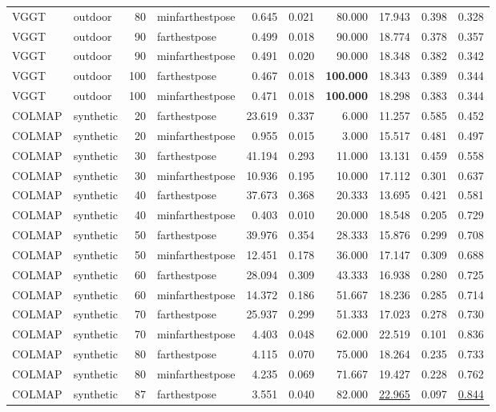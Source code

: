 \begin{table}[H]
\begin{tabular}{llrlrrrrrr}
VGGT & outdoor & 80 & minfarthestpose & 0.645 & 0.021 & 80.000 & 17.943 & 0.398 & 0.328 \\
VGGT & outdoor & 90 & farthestpose & 0.499 & 0.018 & 90.000 & 18.774 & 0.378 & 0.357 \\
VGGT & outdoor & 90 & minfarthestpose & 0.491 & 0.020 & 90.000 & 18.348 & 0.382 & 0.342 \\
VGGT & outdoor & 100 & farthestpose & 0.467 & 0.018 & \textbf{100.000} & 18.343 & 0.389 & 0.344 \\
VGGT & outdoor & 100 & minfarthestpose & 0.471 & 0.018 & \textbf{100.000} & 18.298 & 0.383 & 0.344 \\
\midrule
COLMAP & synthetic & 20 & farthestpose & 23.619 & 0.337 & 6.000 & 11.257 & 0.585 & 0.452 \\
COLMAP & synthetic & 20 & minfarthestpose & 0.955 & 0.015 & 3.000 & 15.517 & 0.481 & 0.497 \\
COLMAP & synthetic & 30 & farthestpose & 41.194 & 0.293 & 11.000 & 13.131 & 0.459 & 0.558 \\
COLMAP & synthetic & 30 & minfarthestpose & 10.936 & 0.195 & 10.000 & 17.112 & 0.301 & 0.637 \\
COLMAP & synthetic & 40 & farthestpose & 37.673 & 0.368 & 20.333 & 13.695 & 0.421 & 0.581 \\
COLMAP & synthetic & 40 & minfarthestpose & 0.403 & 0.010 & 20.000 & 18.548 & 0.205 & 0.729 \\
COLMAP & synthetic & 50 & farthestpose & 39.976 & 0.354 & 28.333 & 15.876 & 0.299 & 0.708 \\
COLMAP & synthetic & 50 & minfarthestpose & 12.451 & 0.178 & 36.000 & 17.147 & 0.309 & 0.688 \\
COLMAP & synthetic & 60 & farthestpose & 28.094 & 0.309 & 43.333 & 16.938 & 0.280 & 0.725 \\
COLMAP & synthetic & 60 & minfarthestpose & 14.372 & 0.186 & 51.667 & 18.236 & 0.285 & 0.714 \\
COLMAP & synthetic & 70 & farthestpose & 25.937 & 0.299 & 51.333 & 17.023 & 0.278 & 0.730 \\
COLMAP & synthetic & 70 & minfarthestpose & 4.403 & 0.048 & 62.000 & 22.519 & 0.101 & 0.836 \\
COLMAP & synthetic & 80 & farthestpose & 4.115 & 0.070 & 75.000 & 18.264 & 0.235 & 0.733 \\
COLMAP & synthetic & 80 & minfarthestpose & 4.235 & 0.069 & 71.667 & 19.427 & 0.228 & 0.762 \\
COLMAP & synthetic & 87 & farthestpose & 3.551 & 0.040 & 82.000 & \underline{22.965} & 0.097 & \underline{0.844} \\

\end{tabular}
\end{table}
